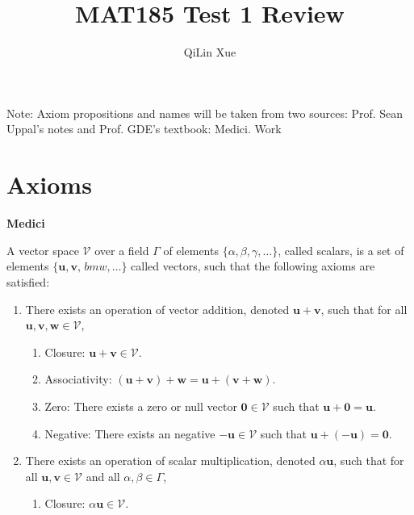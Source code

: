 \documentclass{article}
\title{MAT185 Test 1 Review}
\author{QiLin Xue}
\begin{document}
    \maketitle
    \tableofcontents
    Note: Axiom propositions and names will be taken from two sources: Prof. Sean Uppal's notes and Prof. GDE's textbook: Medici. Work
    \section{Axioms}
    \begin{minipage}[t]{.45\textwidth} %
        \begin{center}
            \textbf{Medici}
        \end{center}
            A vector space $\mathcal{V}$ over a field $\Gamma$ of elements $\{\alpha, \beta, \gamma, \dots\}$, called scalars, is a set of elements $\{\bm{u},\bm{v},\frac{}{}bm{w},\dots\}$ called vectors, such that the following axioms are satisfied:
            \vspace{2mm}
            \begin{enumerate}
                \item There exists an operation of vector addition, denoted $\bm{u}+\bm{v}$, such that for all $\bm{u},\bm{v},\bm{w} \in \mathcal{V}$,
                \vspace{2mm}
                \begin{enumerate}[label=\textbf{A\Roman*.}]
                    \item Closure: $\bm{u}+\bm{v} \in \mathcal{V}$.
                    \item Associativity: $(\bm{u} + \bm{v}) + \bm{w} = \bm{u} + (\bm{v}+\bm{w})$.
                    \item Zero: There exists a zero or null vector $\bm{0} \in \mathcal{V}$ such that $\bm{u}+\bm{0}=\bm{u}$.
                    \item Negative: There exists an negative $\bm{-u} \in \mathcal{V}$ such that $\bm{u}+(\bm{-u}) = \bm{0}$.
                \end{enumerate}
                \item There exists an operation of scalar multiplication, denoted $\alpha\bm{u}$, such that for all $\bm{u},\bm{v} \in \mathcal{V}$ and all $\alpha, \beta \in \Gamma$,
                \vspace{2mm}
                \begin{enumerate}[label=\textbf{M\Roman*.}]
                    \item Closure: $\alpha\bm{u} \in \mathcal{V}$.

\end{enumerate}
\end{enumerate}
\end{minipage}
\end{document}

